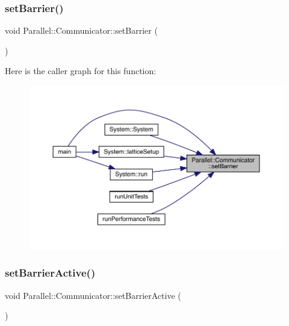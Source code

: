 \subsubsection{\texorpdfstring{setBarrier()}{setBarrier()}}
{\footnotesize\ttfamily void Parallel\+::\+Communicator\+::set\+Barrier (\begin{DoxyParamCaption}{ }\end{DoxyParamCaption})\hspace{0.3cm}{\ttfamily [static]}}

Here is the caller graph for this function\+:\nopagebreak
\begin{figure}[H]
\begin{center}
\leavevmode
\includegraphics[width=350pt]{class_parallel_1_1_communicator_ad48e48ab0137dab329d31fc1e3ebf179_icgraph}
\end{center}
\end{figure}
\mbox{\label{class_parallel_1_1_communicator_a13263be32405fa088f06b07f7fdfe281}} 
\subsubsection{\texorpdfstring{setBarrierActive()}{setBarrierActive()}}
{\footnotesize\ttfamily void Parallel\+::\+Communicator\+::set\+Barrier\+Active (\begin{DoxyParamCaption}{ }\end{DoxyParamCaption})\hspace{0.3cm}{\ttfamily [static]}}

